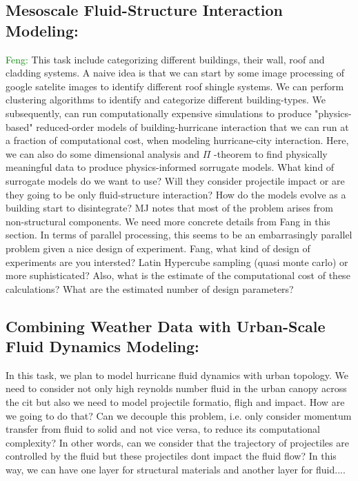 \documentclass{proposalnsf}
\begin{document}
\subsection{Mesoscale Fluid-Structure Interaction Modeling:} \textcolor{green}{Feng:} This task include categorizing different buildings, their wall, roof and cladding systems. A naive idea is that we can start by some image processing of google satelite images to identify different roof shingle systems. We can perform clustering algorithms to identify and categorize different building-types. We subsequently, can run computationally expensive simulations to produce "physics-based" reduced-order models of building-hurricane interaction that we can run at a fraction of computational cost, when modeling hurricane-city interaction. Here, we can also do some dimensional analysis and $\Pi$ -theorem to find physically meaningful data to produce physics-informed sorrugate models. What kind of surrogate models do we want to use? Will they consider projectile impact or are they going to be only fluid-structure interaction? How do the models evolve as a building start to disintegrate? MJ  notes that most of the problem arises from non-structural components. We need more concrete details from Fang in this section. In terms of parallel processing, this seems to be an embarrasingly parallel problem given a nice design of experiment. Fang, what kind of design of experiments are you intersted? Latin Hypercube sampling (quasi monte carlo) or more suphisticated? Also, what is the estimate of the computational cost of these calculations? What are the estimated number of design parameters?
 
\subsection{Combining Weather Data with Urban-Scale Fluid Dynamics Modeling:} In this task, we plan to model hurricane fluid dynamics with urban topology. We need to consider not only high reynolds number fluid in the urban canopy across the cit but also we need to model projectile formatio, fligh and impact. How are we going to do that? Can we decouple this problem, i.e. only consider momentum transfer from fluid to solid and not vice versa, to reduce its computational complexity? In other words, can we consider that the trajectory of projectiles are controlled by the fluid but these projectiles dont impact the fluid flow? In this way, we can have one layer for structural materials and another layer for fluid....
\end{document}
